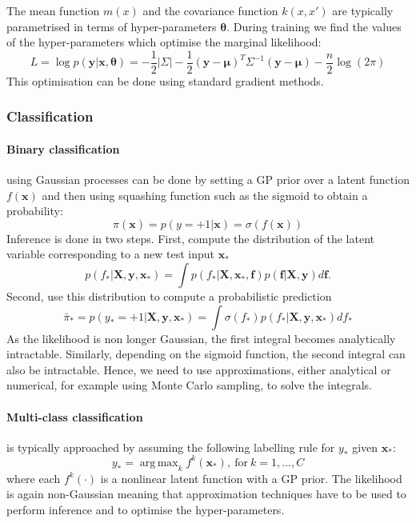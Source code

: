 \documentclass{article}
\DeclareMathOperator*{\argmax}{arg\,max} %
\begin{document}
The mean function $m(x)$ and the covariance function $k(x,x')$ are typically parametrised in terms of hyper-parameters $\bm{\theta}$. During training we find the values of the hyper-parameters which optimise the marginal likelihood:
\begin{equation*}
	L = \log p(\bm{y}\vert\bm{x},\bm{\theta}) = -\frac{1}{2}\vert\Sigma\vert - \frac{1}{2}(\bm{y}-\bm{\mu})^T\Sigma^{-1}(\bm{y}-\bm{\mu}) - \frac{n}{2}\log(2\pi)
\end{equation*}
This optimisation can be done using standard gradient methods.
\subsubsection{Classification}
\paragraph{Binary classification} using Gaussian processes can be done by setting a GP prior over a latent function $f(\mathbf{x})$ and then using squashing function such as the sigmoid to obtain a probability:
\begin{equation*}
	\pi(\mathbf{x}) = p(y = +1 \vert \mathbf{x}) = \sigma(f(\mathbf{x}))
\end{equation*}
Inference is done in two steps. First, compute the distribution of the latent variable corresponding to a new test input $\mathbf{x}_*$
\begin{equation*}
	p(f_*  \vert \mathbf{X}, \mathbf{y}, \mathbf{x}_*) = \int p (f_*  \vert \mathbf{X}, \mathbf{x}_*, \mathbf{f}) p(\mathbf{f} \vert \mathbf{X}, \mathbf{y}) d\mathbf{f}.
\end{equation*}
Second, use this distribution to compute a probabilistic prediction
\begin{equation*}
	\bar{\pi}_* = p(y_* = +1 |\mathbf{X}, \mathbf{y}, \mathbf{x}_*) = \int \sigma(f_*) p(f_*  \vert \mathbf{X}, \mathbf{y}, \mathbf{x}_*) df_*
\end{equation*}
As the likelihood is non longer Gaussian, the first integral becomes analytically intractable. Similarly, depending on the sigmoid function, the second integral can also be intractable. Hence, we need to use approximations, either analytical or numerical, for example using Monte Carlo sampling, to solve the integrals.


\paragraph{Multi-class classification} is typically \cite{villacampa2017scalable} approached by assuming the following labelling rule for $y_*$ given $\mathbf{x}_*$:
\begin{equation*}
	y_* = \argmax_k f^k(\mathbf{x}_*),\ \textrm{for}\ k=1,\dots,C
\end{equation*} 
where each $f^k(\cdot)$ is a nonlinear latent function with a GP prior. The likelihood is again non-Gaussian meaning that approximation techniques have to be used to perform inference and to optimise the hyper-parameters.
\end{document}
